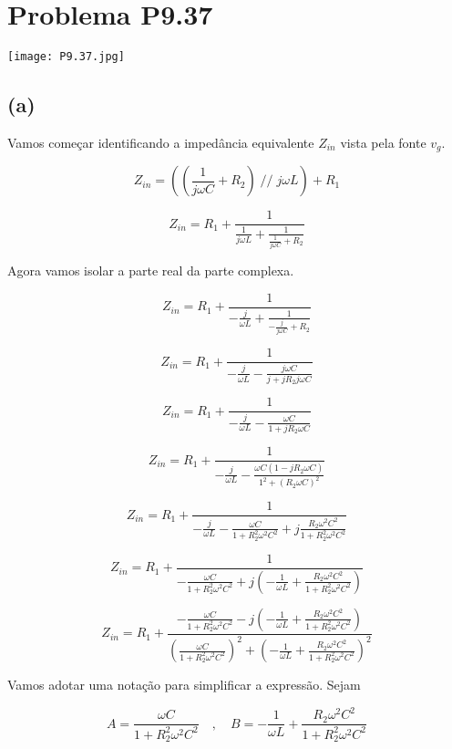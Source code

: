 \section*{Problema P9.37}

\renewcommand*\thesection{9.37}

\begin{center}
    \texttt{[image: P9.37.jpg]}
\end{center}

\subsection*{(a)}

Vamos começar identificando a impedância equivalente \( Z_{in} \) vista pela fonte \( v_g \).

\[ Z_{in} = \left(\left(\frac{1}{j\omega C} + R_2\right) \; // \; j\omega L\right) +  R_1 \]

\[ Z_{in} = R_1 + \frac{1}{\frac{1}{j\omega L} + \frac{1}{\frac{1}{j\omega C} + R_2}}  \]

Agora vamos isolar a parte real da parte complexa.

\[ Z_{in} = R_1 + \frac{1}{-\frac{j}{\omega L} + \frac{1}{-\frac{j}{j\omega C} + R_2}}  \]

\[ Z_{in} = R_1 + \frac{1}{-\frac{j}{\omega L} - \frac{j\omega C}{j + jR_2j\omega C}}  \]

\[ Z_{in} = R_1 + \frac{1}{-\frac{j}{\omega L} - \frac{\omega C}{1 + jR_2\omega C}}  \]

\[ Z_{in} = R_1 + \frac{1}{-\frac{j}{\omega L} - \frac{\omega C(1 - jR_2\omega C)}{1^2 + (R_2\omega C)^2}}  \]

\[ Z_{in} = R_1 + \frac{1}{-\frac{j}{\omega L} - \frac{\omega C}{1 + R_2^2\omega^2 C^2} + j\frac{R_2\omega^2 C^2}{1 + R_2^2\omega^2 C^2}}  \]

\[ Z_{in} = R_1 + \frac{1}{- \frac{\omega C}{1 + R_2^2\omega^2 C^2} + j\left(-\frac{1}{\omega L} + \frac{R_2\omega^2 C^2}{1 + R_2^2\omega^2 C^2}\right)}  \]

\[ Z_{in} = R_1 + \frac{- \frac{\omega C}{1 + R_2^2\omega^2 C^2} - j\left(-\frac{1}{\omega L} + \frac{R_2\omega^2 C^2}{1 + R_2^2\omega^2 C^2}\right)}{(\frac{\omega C}{1 + R_2^2\omega^2 C^2})^2 + \left(-\frac{1}{\omega L} + \frac{R_2\omega^2 C^2}{1 + R_2^2\omega^2 C^2}\right)^2}  \]

Vamos adotar uma notação para simplificar a expressão. Sejam

\[ 
    A = \frac{\omega C}{1 + R_2^2\omega^2 C^2}
    \quad , \quad
    B = -\frac{1}{\omega L} + \frac{R_2\omega^2 C^2}{1 + R_2^2\omega^2 C^2}
\]

